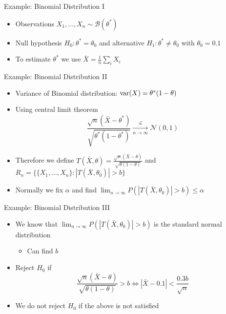 \documentclass{beamer}
\begin{document}
\begin{frame}{Example: Binomial Distribution I}  
\begin{itemize} 
 \item Observations $X_1, \ldots, X_n \sim \mathcal{B}(\theta^*)$ 
 \item Null hypothesis $H_0: \theta^* = \theta_0$ and alternative $H_1: \theta^* \neq \theta_0$ with $\theta_0 = 0.1$ 
 \item To estimate $\theta^*$ we use $\bar{X} = \frac{1}{n}\sum_i X_i$ 
\end{itemize} 
\end{frame}

\begin{frame}{Example: Binomial Distribution II} 
\begin{itemize} 
\item Variance of Binomial distribution: $\mbox{var}(X) = \theta^*(1- \theta)$
\item Using central limit theorem 
\begin{displaymath} 
 \frac{\sqrt{n}(\bar{X} - \theta^*)}{\sqrt{\theta^*(1- \theta^*)}} \xrightarrow[n \rightarrow \infty]{\mathcal{L}} \mathcal{N}(0, 1)
\end{displaymath}
\item Therefore we define $T(\bar{X}, \theta) = \frac{\sqrt{n}(\bar{X} - \theta)}{\sqrt{\theta(1- \theta)}}$ and $R_n = \{\{X_1, \ldots, X_n\}: |T(\bar{X}, \theta_0)| > b\}$
\item Normally we fix $\alpha$ and find $\lim_{n \rightarrow \infty} P(|T(\bar{X}, \theta_0)| > b) \leq \alpha$ 
\end{itemize}
\end{frame}

\begin{frame}{Example: Binomial Distribution III} 
\begin{itemize} 
 \item We know that $\lim_{n \rightarrow \infty} P(|T(\bar{X}, \theta_0)| > b) $ is the standard normal distribution
 \begin{itemize}
 \item Can find $b$ 
 \end{itemize} 
 \item Reject $H_0$ if 
 \begin{displaymath} 
 \frac{\sqrt{n}(\bar{X} - \theta)}{\sqrt{\theta(1- \theta)}} > b \Leftrightarrow |\bar{X} - 0.1| < \frac{0.3b}{\sqrt{n}} 
 \end{displaymath}
\item We do not reject $H_0$ if the above is not satisfied 
\end{itemize}
\end{frame}
\end{document}
